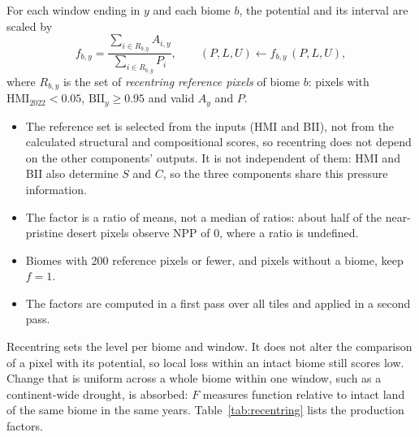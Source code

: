 \documentclass[11pt,a4paper]{article}
\newcommand{\HMI}{\mathrm{HMI}}
\newcommand{\BII}{\mathrm{BII}}
\begin{document}
For each window ending in $y$ and each biome $b$, the potential and its interval are scaled by
\begin{equation}
f_{b,y} = \frac{\sum_{i \in R_{b,y}} A_{i,y}}{\sum_{i \in R_{b,y}} P_i}, \qquad
(P, L, U) \leftarrow f_{b,y}\,(P, L, U),
\end{equation}
where $R_{b,y}$ is the set of \emph{recentring reference pixels} of biome $b$: pixels with
$\HMI_{2022} < 0.05$, $\BII_y \ge 0.95$ and valid $A_y$ and $P$.

\begin{itemize}
\item The reference set is selected from the inputs (HMI and BII), not from the calculated
structural and compositional scores, so recentring does not depend on the other components'
outputs. It is not independent of them: HMI and BII also determine $S$ and $C$, so the three
components share this pressure information.
\item The factor is a ratio of means, not a median of ratios: about half of the near-pristine
desert pixels observe NPP of 0, where a ratio is undefined.
\item Biomes with 200 reference pixels or fewer, and pixels without a biome, keep $f = 1$.
\item The factors are computed in a first pass over all tiles and applied in a second pass.
\end{itemize}

Recentring sets the level per biome and window. It does not alter the comparison of a pixel with
its potential, so local loss within an intact biome still scores low. Change that is uniform
across a whole biome within one window, such as a continent-wide drought, is absorbed: $F$
measures function relative to intact land of the same biome in the same years.
Table~\ref{tab:recentring} lists the production factors.
\end{document}
